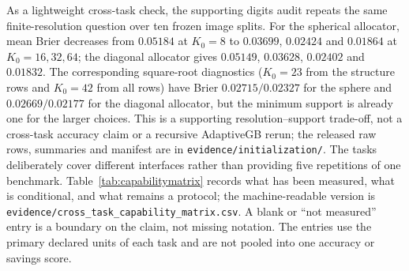 \documentclass[11pt,a4paper]{article}
\numberwithin{equation}{section}
\theoremstyle{definition}\newtheorem{definition}[theorem]{Definition}
\theoremstyle{remark}\newtheorem{remark}[theorem]{Remark}
\begin{document}
As a lightweight cross-task check, the supporting digits audit repeats the same finite-resolution question over ten frozen image splits. For the spherical allocator, mean Brier decreases from $0.05184$ at $K_0=8$ to $0.03699$, $0.02424$ and $0.01864$ at $K_0=16,32,64$; the diagonal allocator gives $0.05149$, $0.03628$, $0.02402$ and $0.01832$. The corresponding square-root diagnostics ($K_0=23$ from the structure rows and $K_0=42$ from all rows) have Brier $0.02715/0.02327$ for the sphere and $0.02669/0.02177$ for the diagonal allocator, but the minimum support is already one for the larger choices. This is a supporting resolution--support trade-off, not a cross-task accuracy claim or a recursive AdaptiveGB rerun; the released raw rows, summaries and manifest are in \texttt{evidence/initialization/}.
The tasks deliberately cover different interfaces rather than providing five repetitions of one benchmark. Table~\ref{tab:capabilitymatrix} records what has been measured, what is conditional, and what remains a protocol; the machine-readable version is \texttt{evidence/cross\_task\_capability\_matrix.csv}. A blank or ``not measured'' entry is a boundary on the claim, not missing notation. The entries use the primary declared units of each task and are not pooled into one accuracy or savings score.
\end{document}
